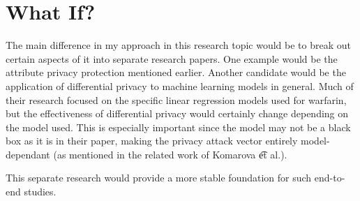 \documentclass{article}
\begin{document}
\section{What If?}

The main difference in my approach in this research topic would be to break out
certain aspects of it into separate research papers. One example would be the
attribute privacy protection mentioned earlier. Another candidate would be the
application of differential privacy to machine learning models in general. Much
of their research focused on the specific linear regression models used for
warfarin, but the effectiveness of differential privacy would certainly change
depending on the model used. This is especially important since the model may
not be a black box as it is in their paper, making the privacy attack vector
entirely model-dependant (as mentioned in the related work of Komarova {\t et
al.}).

This separate research would provide a more stable foundation for such
end-to-end studies.
\end{document}
